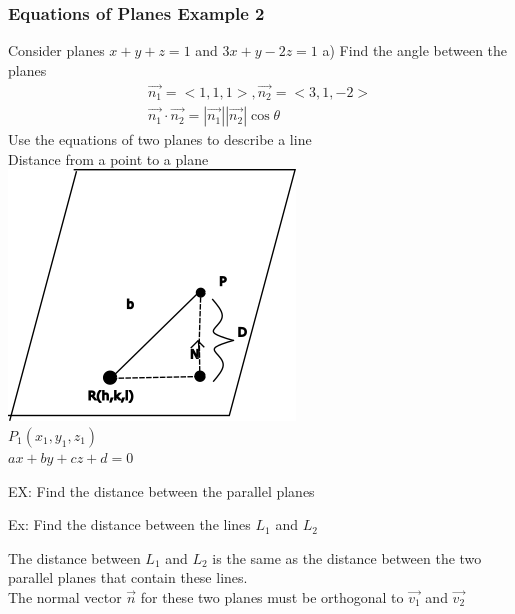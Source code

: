 \documentclass[12pt]{article}
\begin{document}
\subsubsection{Equations of Planes Example 2}
Consider planes $x+y+z=1$ and $3x+y-2z=1$
a) Find the angle between the planes
\begin{align}
	\vec{n_1}=<1,1,1>,\vec{n_2}=<3,1,-2> \\%
	\vec{n_1} \cdot {\vec{n_2}}=|\vec{n_1}||\vec{n_2}|\cos\theta 
\end{align}
Use the equations of two planes to describe a line\\%
Distance from a point to a plane\\%
\includegraphics{ramppbn}\\%
$P_1(x_1,y_1,z_1)$\\%
$ax+by+cz+d=0$


EX: Find the distance between the parallel planes

Ex: Find the distance between the lines $L_1$ and $L_2$ 

The distance between $L_1$ and $L_2$ is the same as the distance between the two parallel planes that contain these lines.\\
The normal vector $\vec{n}$ for these two planes must be orthogonal to $\vec{v_1}$ and $\vec{v_2}$
\end{document}
